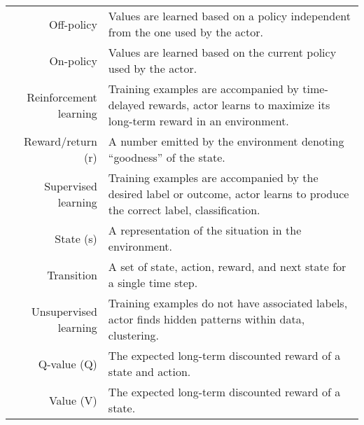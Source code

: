 \begin{longtable}{@{}r|Y@{}}
	Off-policy & Values are learned based on a policy independent from the one used by the actor. \\
	On-policy & Values are learned based on the current policy used by the actor. \\
	Reinforcement learning & Training examples are accompanied by time-delayed rewards, actor learns to maximize its long-term reward in an environment. \\
	Reward/return (r) & A number emitted by the environment denoting ``goodness'' of the state. \\
	Supervised learning & Training examples are accompanied by the desired label or outcome, actor learns to produce the correct label, classification. \\
	State (s) & A representation of the situation in the environment. \\
	Transition & A set of state, action, reward, and next state for a single time step. \\
	Unsupervised learning & Training examples do not have associated labels, actor finds hidden patterns within data, clustering.  \\
	Q-value (Q) & The expected long-term discounted reward of a state and action. \\
	Value (V) & The expected long-term discounted reward of a state. \\
	\bottomrule 
\end{longtable} 
